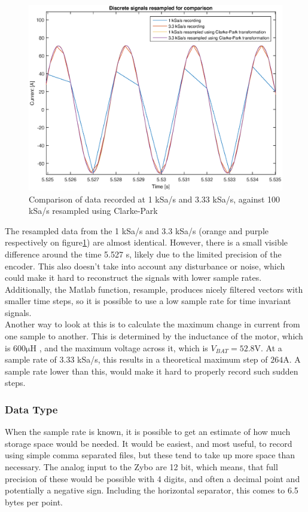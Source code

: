 \begin{figure}
	\centering
	\includegraphics[width = 0.9\linewidth]{graphics/Clarke-park_resampled}	
	\caption{Comparison of data recorded at 1 kSa/s and 3.33 kSa/s, against 100 kSa/s resampled using Clarke-Park}
	\label{fig:Clarke-park_resampled}
\end{figure}

The resampled data from the 1 kSa/s and 3.3 kSa/s (orange and purple respectively on figure\ref{fig:Clarke-park_resampled}) are almost identical.
However, there is a small visible difference around the time 5.527 s, likely due to the limited precision of the encoder.
This also doesn't take into account any disturbance or noise, which could make it hard to reconstruct the signals with lower sample rates.\\

Additionally, the Matlab function, resample, produces nicely filtered vectors with smaller time steps, so it is possible to use a low sample rate for time invariant signals.\\
Another way to look at this is to calculate the maximum change in current from one sample to another.
This is determined by the inductance of the motor, which is $600 \si{\micro \henry}$ , and the maximum voltage across it, which is $V_{BAT}=52.8 \si{\volt}$. 
At a sample rate of 3.33 kSa/s, this results in a theoretical maximum step of $264\si{\ampere}$.
A sample rate lower than this, would make it hard to properly record such sudden steps.

\subsubsection{Data Type}
When the sample rate is known, it is possible to get an estimate of how much storage space would be needed. 
It would be easiest, and most useful, to record using simple comma separated files, but these tend to take up more space than necessary.
The analog input to the Zybo are 12 bit, which means, that full precision of these would be possible with 4 digits, and often a decimal point and potentially a negative sign.
Including the horizontal separator, this comes to 6.5 bytes per point.\\

